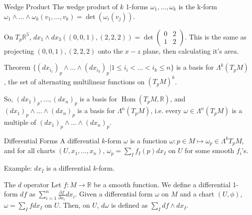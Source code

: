 \documentclass[9pt]{beamer}
\DeclareMathOperator{\Hom}{Hom}
\DeclareMathOperator{\Det}{det}
\begin{document}
\begin{frame}
    \begin{block}{Wedge Product}
        The wedge product of $k$ 1-forms $\omega_1, \dots, \omega_k$ is the k-form $\omega_1\wedge\dots\wedge\omega_k(v_1, \dots, v_k)=\Det(\omega_i(v_j))$.
    \end{block}
    On $T_p\mathbb{R}^5$, $dx_1\wedge dx_3((0,0,1), (2,2,2))=\Det\begin{pmatrix} 0 & 2 \\
        1 & 2
    \end{pmatrix}$. This is the same as projecting $(0,0,1), (2,2,2)$ onto the $x-z$ plane, then calculating it's area.
    
    \begin{block}{Theorem}
        $\{(dx_{i_1})_p\wedge\dots\wedge (dx_{i_k})_p|1\leq i_i<\dots<i_k\leq n\}$ is a basis for $\Lambda^k(T_pM)$, the set of alternating multilinear functions on $(T_pM)^k$.
    \end{block}
    So, $(dx_1)_p, \dots, (dx_n)_p$ is a basis for $\Hom(T_p M, \mathbb{R})$, and $(dx_1)_p\wedge\dots\wedge (dx_n)_p$ is a basis for $\Lambda^n(T_pM)$, i.e. every $\omega\in\Lambda^n(T_pM)$ is a multiple of $(dx_1)_p\wedge\dots\wedge (dx_n)_p$.
\end{frame}

\begin{frame}
    \begin{block}{Differential Forms}
        A differential $k$-form $\omega$ is a function $\omega: p\in M \mapsto \omega_p\in\Lambda^kT_pM$, and for all charts $(U, x_1, \dots, x_n)$, $\omega_p=\sum_I f_I(p)dx_I$ on $U$ for some smooth $f_i$'s.
    \end{block}

    Example: $dx_I$ is a differential $k$-form.

    \begin{block}{The $d$ operator}
        Let $f:M\rightarrow \mathbb{R}$ be a smooth function. We define a differential 1-form $df$ as $\sum_{i=1}^n \frac{\partial f}{\partial x_i}dx_i$.
        Given a differential form $\omega$ on $M$ and a chart $(U, \phi)$, $\omega=\sum_I f dx_I$ on $U$. Then, on $U$, $d\omega$ is defined as $\sum_I df\wedge dx_I$.
    \end{block}

\end{frame}
\end{document}
